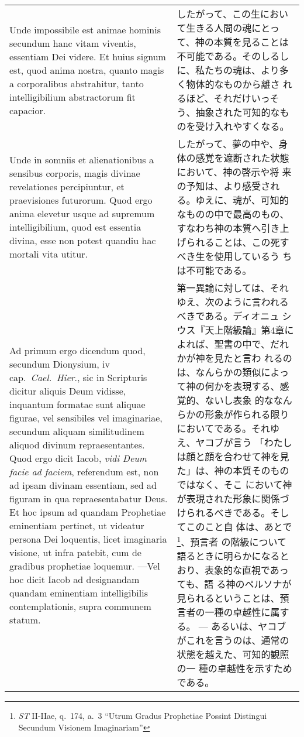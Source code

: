 \documentclass[10pt]{jsarticle} %
\begin{document}
\begin{longtable}{p{21em}p{21em}}
\\

Unde impossibile est animae hominis secundum hanc vitam viventis,
essentiam Dei videre. Et huius signum est, quod anima nostra, quanto
magis a corporalibus abstrahitur, tanto intelligibilium abstractorum
fit capacior.

&

したがって、この生において生きる人間の魂にとって、神の本質を見ることは
不可能である。そのしるしに、私たちの魂は、より多く物体的なものから離さ
れるほど、それだけいっそう、抽象された可知的なものを受け入れやすくなる。

\\

Unde in somniis et alienationibus a sensibus corporis, magis divinae
revelationes percipiuntur, et praevisiones futurorum. Quod ergo anima
elevetur usque ad supremum intelligibilium, quod est essentia divina,
esse non potest quandiu hac mortali vita utitur.

&

したがって、夢の中や、身体の感覚を遮断された状態において、神の啓示や将
来の予知は、より感受される。ゆえに、魂が、可知的なものの中で最高のもの、
すなわち神の本質へ引き上げられることは、この死すべき生を使用しているう
ちは不可能である。

\\

{\sc Ad primum ergo dicendum} quod, secundum Dionysium, {\sc iv}
cap.~{\it Cael.~Hier}., sic in Scripturis dicitur aliquis Deum
vidisse, inquantum formatae sunt aliquae figurae, vel sensibiles vel
imaginariae, secundum aliquam similitudinem aliquod divinum
repraesentantes. Quod ergo dicit Iacob, {\it vidi Deum facie ad
faciem}, referendum est, non ad ipsam divinam essentiam, sed ad
figuram in qua repraesentabatur Deus. Et hoc ipsum ad quandam
Prophetiae eminentiam pertinet, ut videatur persona Dei loquentis,
licet imaginaria visione, ut infra patebit, cum de gradibus prophetiae
loquemur. ---Vel hoc dicit Iacob ad designandam quandam eminentiam
intelligibilis contemplationis, supra communem statum.

&

第一異論に対しては、それゆえ、次のように言われるべきである。ディオニュ
シウス『天上階級論』第4章によれば、聖書の中で、だれかが神を見たと言わ
れるのは、なんらかの類似によって神の何かを表現する、感覚的、ないし表象
的ななんらかの形象が作られる限りにおいてである。それゆえ、ヤコブが言う
「わたしは顔と顔を合わせて神を見た」は、神の本質そのものではなく、そこ
において神が表現された形象に関係づけられるべきである。そしてこのこと自
体は、あとで\footnote{{\it ST} II-IIae, q.~174, a.~3 ``Utrum Gradus
Prophetiae Possint Distingui Secundum Visionem Imaginariam''}、預言者
の階級について語るときに明らかになるとおり、表象的な直視であっても、語
る神のペルソナが見られるということは、預言者の一種の卓越性に属する。
---
あるいは、ヤコブがこれを言うのは、通常の状態を越えた、可知的観照の一
 種の卓越性を示すためである。


\end{longtable}
\end{document}
